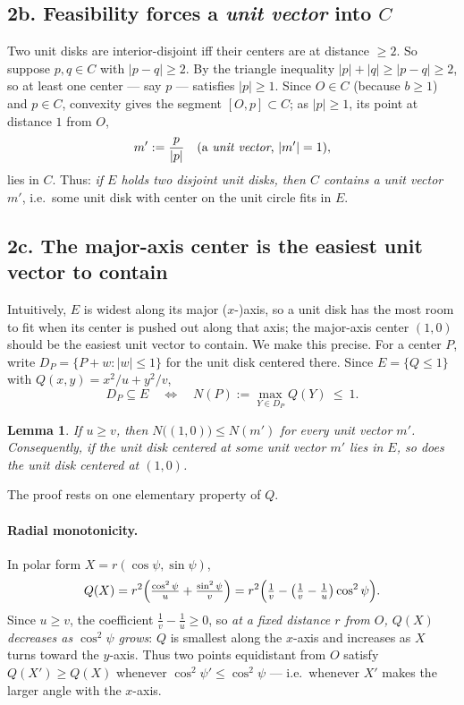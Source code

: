 \documentclass[11pt]{article}
\newtheorem{lemma}{Lemma}
\begin{document}
\subsection*{2b. Feasibility forces a \emph{unit vector} into $C$}

Two unit disks are interior-disjoint iff their centers are at distance $\ge2$. So suppose
$p,q\in C$ with $|p-q|\ge2$. By the triangle inequality $|p|+|q|\ge|p-q|\ge2$, so at least one
center --- say $p$ --- satisfies $|p|\ge1$. Since $O\in C$ (because $b\ge1$) and $p\in C$, convexity
gives the segment $[O,p]\subset C$; as $|p|\ge1$, its point at distance $1$ from $O$,
\[
m':=\frac{p}{|p|}\quad(\text{a \emph{unit vector}, }|m'|=1),
\]
lies in $C$. Thus: \emph{if $E$ holds two disjoint unit disks, then $C$ contains a
unit vector $m'$}, i.e.\ some unit disk with center on the unit circle fits in $E$.

\subsection*{2c. The major-axis center is the easiest unit vector to contain}

Intuitively, $E$ is widest along its major ($x$-)axis, so a unit disk has the most room to fit when
its center is pushed out along that axis; the major-axis center $(1,0)$ should be the easiest unit
vector to contain. We make this precise. For a center $P$, write $D_P=\{P+w:|w|\le1\}$ for the unit
disk centered there. Since $E=\{Q\le1\}$ with $Q(x,y)=x^2/u+y^2/v$,
\[
  D_P\subseteq E\quad\iff\quad N(P):=\max_{Y\in D_P}Q(Y)\ \le\ 1 .
\]

\begin{lemma}\label{lem:major}
If $u\ge v$, then $N\bigl((1,0)\bigr)\le N(m')$ for every unit vector $m'$. Consequently, if the
unit disk centered at some unit vector $m'$ lies in $E$, so does the unit disk centered at $(1,0)$.
\end{lemma}

The proof rests on one elementary property of $Q$.

\paragraph{Radial monotonicity.} In polar form $X=r(\cos\psi,\sin\psi)$,
\begin{equation}\label{eq:radial}
  Q(X)=r^2\Bigl(\tfrac{\cos^2\psi}{u}+\tfrac{\sin^2\psi}{v}\Bigr)
       =r^2\Bigl(\tfrac1v-\bigl(\tfrac1v-\tfrac1u\bigr)\cos^2\psi\Bigr).
\end{equation}
Since $u\ge v$, the coefficient $\tfrac1v-\tfrac1u\ge0$, so \emph{at a fixed distance $r$ from $O$,
$Q(X)$ decreases as $\cos^2\psi$ grows}: $Q$ is smallest along the $x$-axis and increases as $X$ turns
toward the $y$-axis. Thus two points equidistant from $O$ satisfy $Q(X')\ge Q(X)$ whenever
$\cos^2\psi'\le\cos^2\psi$ --- i.e.\ whenever $X'$ makes the larger angle with the $x$-axis.
\end{document}
